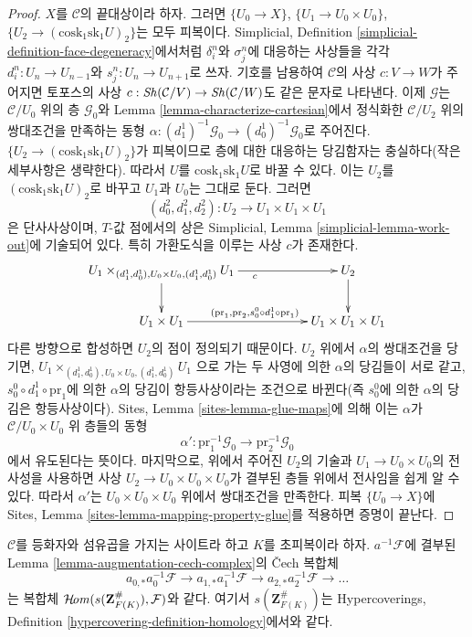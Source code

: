 \begin{proof}
\medskip\noindent
$X$를 $\mathcal{C}$의 끝대상이라 하자. 그러면
$\{U_0 \to X\}$, $\{U_1 \to U_0 \times U_0\}$,
$\{U_2 \to (\text{cosk}_1 \text{sk}_1 U)_2\}$는 모두 피복이다.
Simplicial, Definition \ref{simplicial-definition-face-degeneracy}에서처럼
$\delta^n_i$와 $\sigma^n_j$에 대응하는 사상들을 각각
$d^n_i : U_n \to U_{n - 1}$와 $s^n_j : U_n \to U_{n + 1}$로 쓰자.
기호를 남용하여 $\mathcal{C}$의 사상 $c : V \to W$가 주어지면
토포스의 사상 $c : \mathop{\mathit{Sh}}\nolimits(\mathcal{C}/V) \to \mathop{\mathit{Sh}}\nolimits(\mathcal{C}/W)$도
같은 문자로 나타낸다. 이제 $\mathcal{G}$는 $\mathcal{C}/U_0$ 위의 층
$\mathcal{G}_0$와 Lemma \ref{lemma-characterize-cartesian}에서 정식화한
$\mathcal{C}/U_2$ 위의 쌍대조건을 만족하는 동형
$\alpha : (d^1_1)^{-1}\mathcal{G}_0 \to
(d^1_0)^{-1}\mathcal{G}_0$로 주어진다.
$\{U_2 \to (\text{cosk}_1 \text{sk}_1 U)_2\}$가 피복이므로
층에 대한 대응하는 당김함자는 충실하다(작은 세부사항은 생략한다).
따라서 $U$를 $\text{cosk}_1 \text{sk}_1 U$로 바꿀 수 있다.
이는 $U_2$를 $(\text{cosk}_1 \text{sk}_1 U)_2$로 바꾸고
$U_1$과 $U_0$는 그대로 둔다. 그러면
$$
(d^2_0, d^2_1, d^2_2) : U_2 \to U_1 \times U_1 \times U_1
$$
은 단사사상이며, $T$-값 점에서의 상은
Simplicial, Lemma \ref{simplicial-lemma-work-out}에 기술되어 있다.
특히 가환도식을 이루는 사상 $c$가 존재한다.
$$
\xymatrix{
U_1 \times_{(d^1_1, d^1_0), U_0 \times U_0, (d^1_1, d^1_0)} U_1
\ar[d] \ar[rr]_c & & U_2 \ar[d] \\
U_1 \times U_1
\ar[rr]^{(\text{pr}_1, \text{pr}_2, s^0_0 \circ d^1_1 \circ \text{pr}_1)} & &
U_1 \times U_1 \times U_1
}
$$
다른 방향으로 합성하면 $U_2$의 점이 정의되기 때문이다.
$U_2$ 위에서 $\alpha$의 쌍대조건을 당기면,
$U_1 \times_{(d^1_1, d^1_0), U_0 \times U_0, (d^1_1, d^1_0)} U_1$
으로 가는 두 사영에 의한 $\alpha$의 당김들이 서로 같고,
$s^0_0 \circ d^1_1 \circ \text{pr}_1$에 의한 $\alpha$의 당김이
항등사상이라는 조건으로 바뀐다(즉 $s^0_0$에 의한 $\alpha$의 당김은
항등사상이다). Sites, Lemma \ref{sites-lemma-glue-maps}에 의해 이는
$\alpha$가 $\mathcal{C}/U_0 \times U_0$ 위 층들의 동형
$$
\alpha' : \text{pr}_1^{-1}\mathcal{G}_0 \to \text{pr}_2^{-1}\mathcal{G}_0
$$
에서 유도된다는 뜻이다. 마지막으로, 위에서 주어진 $U_2$의 기술과
$U_1 \to U_0 \times U_0$의 전사성을 사용하면 사상
$U_2 \to U_0 \times U_0 \times U_0$가 결부된 층들 위에서
전사임을 쉽게 알 수 있다. 따라서 $\alpha'$는
$U_0 \times U_0 \times U_0$ 위에서 쌍대조건을 만족한다.
피복 $\{U_0 \to X\}$에 Sites, Lemma
\ref{sites-lemma-mapping-property-glue}를 적용하면 증명이 끝난다.
\end{proof}

\begin{lemma}
\label{lemma-hypercovering-cech-complex}
$\mathcal{C}$를 등화자와 섬유곱을 가지는 사이트라 하고 $K$를
초피복이라 하자. $a^{-1}\mathcal{F}$에 결부된
Lemma \ref{lemma-augmentation-cech-complex}의 {\v C}ech 복합체
$$
a_{0, *}a_0^{-1}\mathcal{F} \to a_{1, *}a_1^{-1}\mathcal{F} \to
a_{2, *}a_2^{-1}\mathcal{F} \to \ldots
$$
는 복합체 $\mathop{\mathcal{H}\!\mathit{om}}\nolimits(s(\mathbf{Z}_{F(K)}^\#), \mathcal{F})$와 같다.
여기서 $s(\mathbf{Z}_{F(K)}^\#)$는 Hypercoverings, Definition
\ref{hypercovering-definition-homology}에서와 같다.
\end{lemma}

